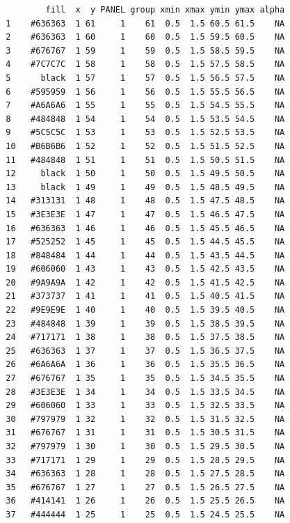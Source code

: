 \documentclass[12pt,twoside]{reedthesis}
\begin{document}
  \begin{Shaded}
  \begin{Highlighting}[]
  \NormalTok{g$data[[}\NormalTok{]]}
  \end{Highlighting}
  \end{Shaded}
  
  \begin{verbatim}
          fill  x  y PANEL group xmin xmax ymin ymax alpha
  1    #636363  1 61     1    61  0.5  1.5 60.5 61.5    NA
  2    #636363  1 60     1    60  0.5  1.5 59.5 60.5    NA
  3    #676767  1 59     1    59  0.5  1.5 58.5 59.5    NA
  4    #7C7C7C  1 58     1    58  0.5  1.5 57.5 58.5    NA
  5      black  1 57     1    57  0.5  1.5 56.5 57.5    NA
  6    #595959  1 56     1    56  0.5  1.5 55.5 56.5    NA
  7    #A6A6A6  1 55     1    55  0.5  1.5 54.5 55.5    NA
  8    #484848  1 54     1    54  0.5  1.5 53.5 54.5    NA
  9    #5C5C5C  1 53     1    53  0.5  1.5 52.5 53.5    NA
  10   #B6B6B6  1 52     1    52  0.5  1.5 51.5 52.5    NA
  11   #484848  1 51     1    51  0.5  1.5 50.5 51.5    NA
  12     black  1 50     1    50  0.5  1.5 49.5 50.5    NA
  13     black  1 49     1    49  0.5  1.5 48.5 49.5    NA
  14   #313131  1 48     1    48  0.5  1.5 47.5 48.5    NA
  15   #3E3E3E  1 47     1    47  0.5  1.5 46.5 47.5    NA
  16   #636363  1 46     1    46  0.5  1.5 45.5 46.5    NA
  17   #525252  1 45     1    45  0.5  1.5 44.5 45.5    NA
  18   #848484  1 44     1    44  0.5  1.5 43.5 44.5    NA
  19   #606060  1 43     1    43  0.5  1.5 42.5 43.5    NA
  20   #9A9A9A  1 42     1    42  0.5  1.5 41.5 42.5    NA
  21   #373737  1 41     1    41  0.5  1.5 40.5 41.5    NA
  22   #9E9E9E  1 40     1    40  0.5  1.5 39.5 40.5    NA
  23   #484848  1 39     1    39  0.5  1.5 38.5 39.5    NA
  24   #717171  1 38     1    38  0.5  1.5 37.5 38.5    NA
  25   #636363  1 37     1    37  0.5  1.5 36.5 37.5    NA
  26   #6A6A6A  1 36     1    36  0.5  1.5 35.5 36.5    NA
  27   #676767  1 35     1    35  0.5  1.5 34.5 35.5    NA
  28   #3E3E3E  1 34     1    34  0.5  1.5 33.5 34.5    NA
  29   #606060  1 33     1    33  0.5  1.5 32.5 33.5    NA
  30   #797979  1 32     1    32  0.5  1.5 31.5 32.5    NA
  31   #676767  1 31     1    31  0.5  1.5 30.5 31.5    NA
  32   #797979  1 30     1    30  0.5  1.5 29.5 30.5    NA
  33   #717171  1 29     1    29  0.5  1.5 28.5 29.5    NA
  34   #636363  1 28     1    28  0.5  1.5 27.5 28.5    NA
  35   #676767  1 27     1    27  0.5  1.5 26.5 27.5    NA
  36   #414141  1 26     1    26  0.5  1.5 25.5 26.5    NA
  37   #444444  1 25     1    25  0.5  1.5 24.5 25.5    NA

\end{verbatim}
\end{document}
